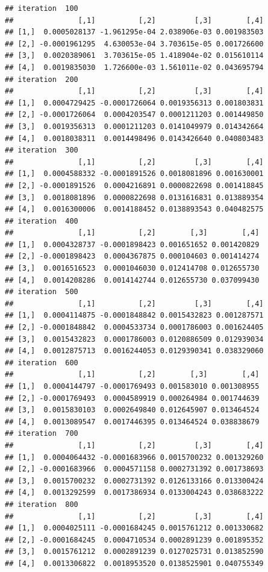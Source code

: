 \documentclass[
]{article}
\begin{document}
\begin{verbatim}
## iteration  100 
##               [,1]          [,2]         [,3]        [,4]
## [1,]  0.0005028137 -1.961295e-04 2.038906e-03 0.001983503
## [2,] -0.0001961295  4.630053e-04 3.703615e-05 0.001726600
## [3,]  0.0020389061  3.703615e-05 1.418904e-02 0.015610114
## [4,]  0.0019835030  1.726600e-03 1.561011e-02 0.043695794
## iteration  200 
##               [,1]          [,2]         [,3]        [,4]
## [1,]  0.0004729425 -0.0001726064 0.0019356313 0.001803831
## [2,] -0.0001726064  0.0004203547 0.0001211203 0.001449850
## [3,]  0.0019356313  0.0001211203 0.0141049979 0.014342664
## [4,]  0.0018038311  0.0014498496 0.0143426640 0.040803483
## iteration  300 
##               [,1]          [,2]         [,3]        [,4]
## [1,]  0.0004588332 -0.0001891526 0.0018081896 0.001630001
## [2,] -0.0001891526  0.0004216891 0.0000822698 0.001418845
## [3,]  0.0018081896  0.0000822698 0.0131616831 0.013889354
## [4,]  0.0016300006  0.0014188452 0.0138893543 0.040482575
## iteration  400 
##               [,1]          [,2]        [,3]        [,4]
## [1,]  0.0004328737 -0.0001898423 0.001651652 0.001420829
## [2,] -0.0001898423  0.0004367875 0.000104603 0.001414274
## [3,]  0.0016516523  0.0001046030 0.012414708 0.012655730
## [4,]  0.0014208286  0.0014142744 0.012655730 0.037099430
## iteration  500 
##               [,1]          [,2]         [,3]        [,4]
## [1,]  0.0004114875 -0.0001848842 0.0015432823 0.001287571
## [2,] -0.0001848842  0.0004533734 0.0001786003 0.001624405
## [3,]  0.0015432823  0.0001786003 0.0120886509 0.012939034
## [4,]  0.0012875713  0.0016244053 0.0129390341 0.038329060
## iteration  600 
##               [,1]          [,2]        [,3]        [,4]
## [1,]  0.0004144797 -0.0001769493 0.001583010 0.001308955
## [2,] -0.0001769493  0.0004589919 0.000264984 0.001744639
## [3,]  0.0015830103  0.0002649840 0.012645907 0.013464524
## [4,]  0.0013089547  0.0017446395 0.013464524 0.038838679
## iteration  700 
##               [,1]          [,2]         [,3]        [,4]
## [1,]  0.0004064432 -0.0001683966 0.0015700232 0.001329260
## [2,] -0.0001683966  0.0004571158 0.0002731392 0.001738693
## [3,]  0.0015700232  0.0002731392 0.0126133166 0.013300424
## [4,]  0.0013292599  0.0017386934 0.0133004243 0.038683222
## iteration  800 
##               [,1]          [,2]         [,3]        [,4]
## [1,]  0.0004025111 -0.0001684245 0.0015761212 0.001330682
## [2,] -0.0001684245  0.0004710534 0.0002891239 0.001895352
## [3,]  0.0015761212  0.0002891239 0.0127025731 0.013852590
## [4,]  0.0013306822  0.0018953520 0.0138525901 0.040755349

\end{verbatim}
\end{document}
